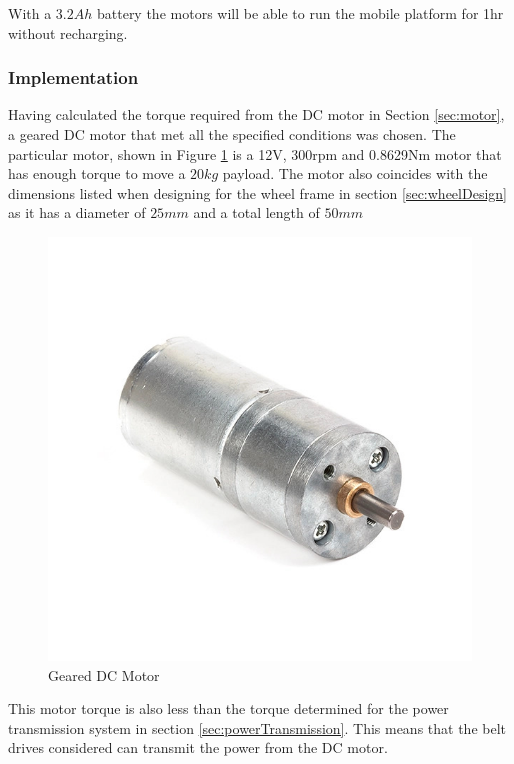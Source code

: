 With a $3.2 Ah$ battery the motors will be able to run the mobile platform for 1hr without recharging.

\subsubsection{Implementation}
Having calculated the torque required from the \ac{DC} motor in Section \ref{sec:motor}, a geared \ac{DC} motor that met all the specified conditions was chosen. The particular motor, shown  in Figure \ref{fig:dcMotor} is a 12V, 300rpm and 0.8629Nm motor that has enough torque to move a $20kg$ payload. The motor also coincides with the dimensions listed when designing for the wheel frame in section \ref{sec:wheelDesign} as it has a diameter of $25mm$ and a total length of $50mm$

\begin{figure}[H]
    \centering
    \includegraphics[scale = 0.4]{Figures/dcMotor.jpg}
    \caption{Geared \ac{DC} Motor}
    \label{fig:dcMotor}
\end{figure}

This motor torque is also less than the torque determined for the power transmission system in section \ref{sec:powerTransmission}. This means that the belt drives considered can transmit the power from the \ac{DC} motor.

